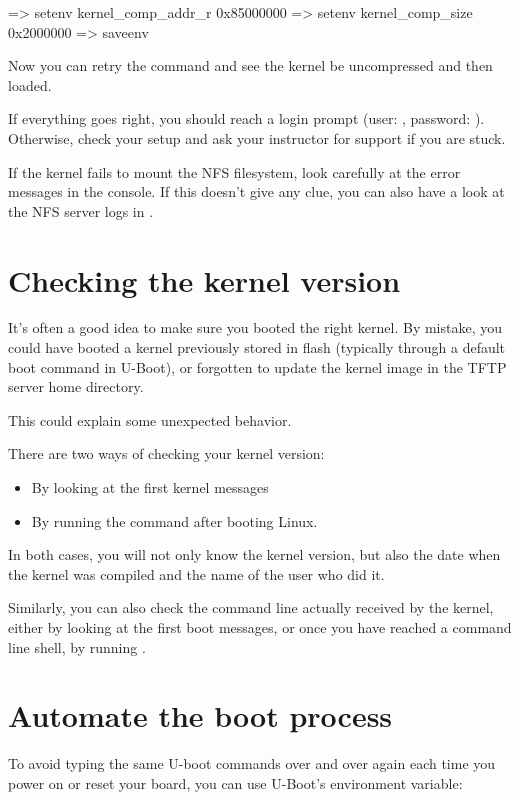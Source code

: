 \begin{ubootinput}
=> setenv kernel_comp_addr_r 0x85000000
=> setenv kernel_comp_size 0x2000000
=> saveenv
\end{ubootinput}

Now you can retry the  command and see the kernel be uncompressed
and then loaded.

If everything goes right, you should reach a login prompt (user:
, password: ). Otherwise, check your setup and
ask your instructor for support if you are stuck.

If the kernel fails to mount the NFS filesystem, look carefully at the
error messages in the console. If this doesn't give any clue, you can
also have a look at the NFS server logs in .

\section{Checking the kernel version}

It's often a good idea to make sure you booted the right kernel.
By mistake, you could have booted a kernel previously stored in flash
(typically through a default boot command in U-Boot), or forgotten to
update the kernel image in the TFTP server home directory.

This could explain some unexpected behavior.

There are two ways of checking your kernel version:
\begin{itemize}
\item By looking at the first kernel messages
\item By running the  command after booting Linux.
\end{itemize}

In both cases, you will not only know the kernel version, but also
the date when the kernel was compiled and the name of the user who
did it.

Similarly, you can also check the command line actually received by
the kernel, either by looking at the first boot messages, or once you
have reached a command line shell, by running .

\section{Automate the boot process}

To avoid typing the same U-boot commands over and over again each time
you power on or reset your board, you can use U-Boot's 
environment variable:

